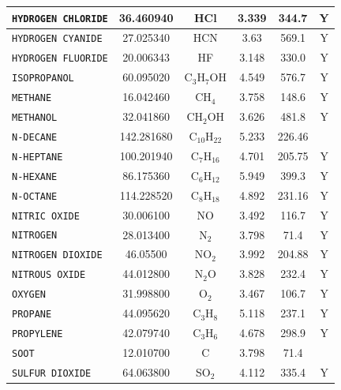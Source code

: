 \documentclass[11pt]{book}
\newcommand{\ct}{\tt\small}
\begin{document}
\begin{table}[ht]
\begin{center}
\begin{tabular}{|l|c|c|c|c|c|}
{\ct HYDROGEN CHLORIDE}  & 36.460940 & HCl              & 3.339    & 344.7           &    Y   \\ \hline
{\ct HYDROGEN CYANIDE}   & 27.025340 & HCN              & 3.63     & 569.1           &    Y   \\ \hline
{\ct HYDROGEN FLUORIDE}  & 20.006343 & HF               & 3.148    & 330.0           &    Y   \\ \hline
{\ct ISOPROPANOL}        & 60.095020 & C$_3$H$_7$OH     & 4.549    & 576.7           &    Y   \\ \hline
{\ct METHANE}            & 16.042460 & CH$_4$           & 3.758    & 148.6           &    Y   \\ \hline
{\ct METHANOL}           & 32.041860 & CH$_2$OH         & 3.626    & 481.8           &    Y   \\ \hline
{\ct N-DECANE}           & 142.281680 & C$_{10}$H$_{22}$ & 5.233    & 226.46          &        \\ \hline
{\ct N-HEPTANE}          & 100.201940 & C$_7$H$_{16}$    & 4.701    & 205.75          &    Y   \\ \hline
{\ct N-HEXANE}           & 86.175360 & C$_6$H$_{12}$    & 5.949    & 399.3           &    Y   \\ \hline
{\ct N-OCTANE}           & 114.228520 & C$_8$H$_{18}$    & 4.892    & 231.16          &    Y   \\ \hline
{\ct NITRIC OXIDE}       & 30.006100 & NO               & 3.492    & 116.7           &    Y   \\ \hline
{\ct NITROGEN}           & 28.013400 & N$_2$            & 3.798    & 71.4            &    Y   \\ \hline
{\ct NITROGEN DIOXIDE}   & 46.05500 & NO$_2$           & 3.992    & 204.88          &    Y   \\ \hline
{\ct NITROUS OXIDE}      & 44.012800 & N$_2$O           & 3.828    & 232.4           &    Y   \\ \hline
{\ct OXYGEN}             & 31.998800 & O$_2$            & 3.467    & 106.7           &    Y   \\ \hline
{\ct PROPANE}            & 44.095620 & C$_3$H$_8$       & 5.118    & 237.1           &    Y   \\ \hline
{\ct PROPYLENE}          & 42.079740 & C$_3$H$_6$       & 4.678    & 298.9           &    Y   \\ \hline
{\ct SOOT}               & 12.010700 & C                & 3.798    & 71.4            &        \\ \hline
{\ct SULFUR DIOXIDE}     & 64.063800 & SO$_2$           & 4.112    & 335.4           &    Y   \\ \hline

\end{tabular}
\end{center}
\end{table}
\end{document}
